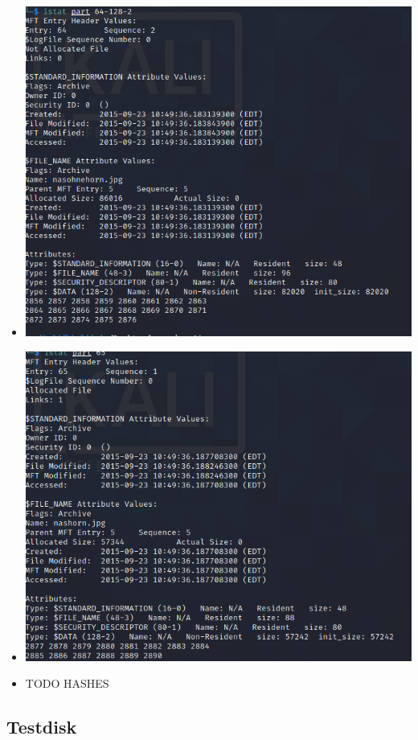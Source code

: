 \begin{itemize}
\item \includegraphics[scale=0.6]{bilder/nasohnehorn_istat.png } 
\item \includegraphics[scale=0.6]{bilder/nashorn_istat.png }
\item TODO HASHES
\end{itemize}

\subsection{Testdisk}


